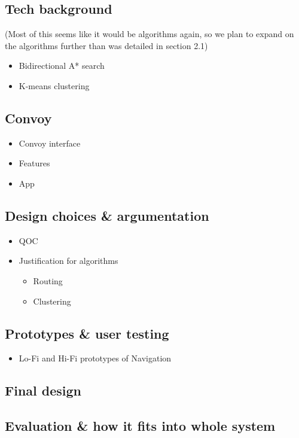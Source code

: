 \documentclass{article}
\begin{document}
\begin{itemize}
\subsection{Tech background}
(Most of this seems like it would be algorithms again, so we plan to expand on the algorithms further than was detailed in section 2.1)
  \begin{itemize}
    \item Bidirectional A* search
    \item K-means clustering
  \end{itemize}
  
\subsection{Convoy}
	\begin{itemize}
    	\item Convoy interface
        \item Features
        \item App
    \end{itemize}
\subsection{Design choices \& argumentation}
  \begin{itemize}
    \item QOC
    \item Justification for algorithms
      \begin{itemize}
        \item Routing
        \item Clustering
      \end{itemize}
  \end{itemize}
\subsection{Prototypes \& user testing}
\begin{itemize}
	\item Lo-Fi and Hi-Fi prototypes of Navigation
\end{itemize}
\subsection{Final design}
\subsection{Evaluation \& how it fits into whole system}


\end{itemize}
\end{document}
